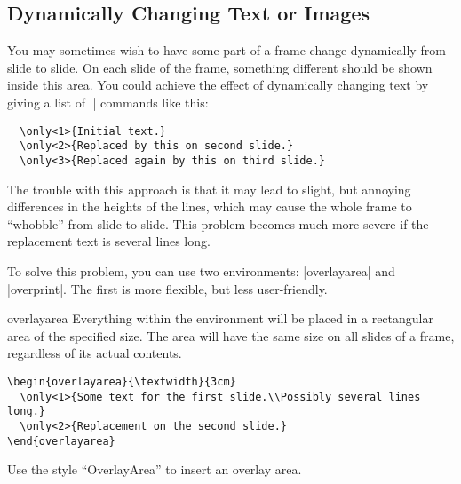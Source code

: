 \subsection{Dynamically Changing Text or Images}

You may sometimes wish to have some part of a frame change dynamically from slide to slide. On each slide of the frame, something different should be shown inside this area. You could achieve the effect of dynamically changing text by giving a list of |\only| commands like this:
\begin{verbatim}
  \only<1>{Initial text.}
  \only<2>{Replaced by this on second slide.}
  \only<3>{Replaced again by this on third slide.}
\end{verbatim}

The trouble with this approach is that it may lead to slight, but annoying differences in the heights of the lines, which may cause the whole frame to ``whobble'' from slide to slide. This problem becomes much more severe if the replacement text is several lines long.

To solve this problem, you can use two environments: |overlayarea| and |overprint|. The first is more flexible, but less user-friendly.

\begin{environment}{{overlayarea}}
  Everything within the environment will be placed in a rectangular area of the specified size. The area will have the same size on all slides of a frame, regardless of its actual contents.

  \example
\begin{verbatim}
\begin{overlayarea}{\textwidth}{3cm}
  \only<1>{Some text for the first slide.\\Possibly several lines long.}
  \only<2>{Replacement on the second slide.}
\end{overlayarea}
\end{verbatim}

  \lyxnote
  Use the style ``OverlayArea'' to insert an overlay area.
\end{environment}

